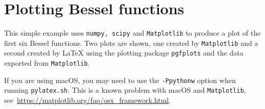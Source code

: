 \documentclass[12pt]{pylatex}
\begin{document}
\section*{Plotting Bessel functions}

\vspace{-5pt}

This simple example uses {\tt\small numpy, scipy} and {\tt\small Matplotlib} to produce a plot of the first six Bessel functions. Two plots are shown, one created by {\tt\small Matplotlib} and a second created by LaTeX using the plotting package {\tt\small pgfplots} and the data exported from {\tt\small Matplotlib}.

If you are using macOS, you may need to use the {\tt\small -Ppythonw} option when running {\tt\small pylatex.sh}. This is a known problem with macOS and {\tt\small Matplotlib}, see\ \url{https://matplotlib.org/faq/osx_framework.html}.

\vspace{-10pt}
\end{document}
